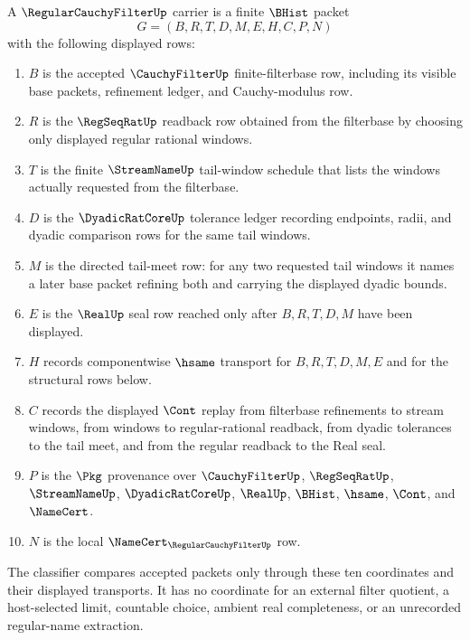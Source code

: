 \begin{definition}
\label{def:regular-cauchy-filter-carrier}
A $\RegularCauchyFilterUp$ carrier is a finite $\BHist$ packet
$$
G=(B,R,T,D,M,E,H,C,P,N)
$$
with the following displayed rows:
\begin{enumerate}
\item $B$ is the accepted $\CauchyFilterUp$ finite-filterbase row, including its visible base packets, refinement ledger, and Cauchy-modulus row.
\item $R$ is the $\RegSeqRatUp$ readback row obtained from the filterbase by choosing only displayed regular rational windows.
\item $T$ is the finite $\StreamNameUp$ tail-window schedule that lists the windows actually requested from the filterbase.
\item $D$ is the $\DyadicRatCoreUp$ tolerance ledger recording endpoints, radii, and dyadic comparison rows for the same tail windows.
\item $M$ is the directed tail-meet row: for any two requested tail windows it names a later base packet refining both and carrying the displayed dyadic bounds.
\item $E$ is the $\RealUp$ seal row reached only after $B,R,T,D,M$ have been displayed.
\item $H$ records componentwise $\hsame$ transport for $B,R,T,D,M,E$ and for the structural rows below.
\item $C$ records the displayed $\Cont$ replay from filterbase refinements to stream windows, from windows to regular-rational readback, from dyadic tolerances to the tail meet, and from the regular readback to the Real seal.
\item $P$ is the $\Pkg$ provenance over $\CauchyFilterUp$, $\RegSeqRatUp$, $\StreamNameUp$, $\DyadicRatCoreUp$, $\RealUp$, $\BHist$, $\hsame$, $\Cont$, and $\NameCert$.
\item $N$ is the local $\NameCert_{\RegularCauchyFilterUp}$ row.
\end{enumerate}
The classifier compares accepted packets only through these ten coordinates and their displayed transports. It has no coordinate for an external filter quotient, a host-selected limit, countable choice, ambient real completeness, or an unrecorded regular-name extraction.
\end{definition}

